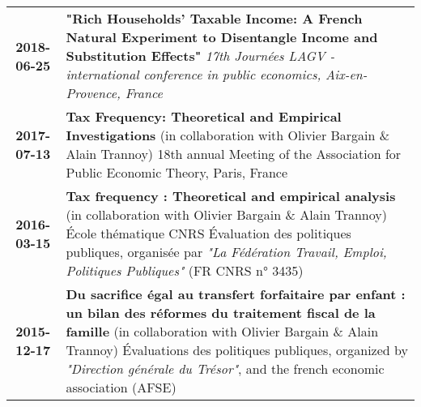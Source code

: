 \documentclass[a4paper,11pt]{article} %
\newcommand\espace{\vrule height 20pt width 0pt}
\begin{document}
\begin{tabular}{c@{ :  }p{}}
\espace
\textbf{2018-06-25} & \textbf{"Rich Households' Taxable Income: A French Natural Experiment to Disentangle Income and Substitution Effects"}
\emph{17th Journées LAGV - international conference in public economics, Aix-en-Provence, France} \\
\textbf{2017-07-13} & \textbf{Tax Frequency: Theoretical and Empirical Investigations} (in collaboration with Olivier Bargain \& Alain Trannoy) 
18th annual Meeting of the Association for Public Economic Theory, Paris, France \\
\textbf{2016-03-15} & \textbf{ Tax frequency : Theoretical and empirical analysis} (in collaboration with Olivier Bargain \& Alain Trannoy)  École thématique CNRS Évaluation des politiques publiques, organisée par \emph{"La Fédération Travail, Emploi, Politiques Publiques"} (FR CNRS n° 3435) \\
\textbf{2015-12-17} & \textbf{ Du sacrifice égal au transfert forfaitaire par enfant : un bilan des réformes du traitement fiscal de la famille} (in collaboration with Olivier Bargain \& Alain Trannoy)  Évaluations des politiques publiques, organized by \emph{"Direction générale du Trésor"}, and the french economic association (AFSE) \\
\end{tabular}
\end{document}
